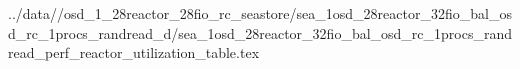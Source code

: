 ../data//osd_1_28reactor_28fio_rc_seastore/sea_1osd_28reactor_32fio_bal_osd_rc_1procs_randread_d/sea_1osd_28reactor_32fio_bal_osd_rc_1procs_randread_perf_reactor_utilization_table.tex